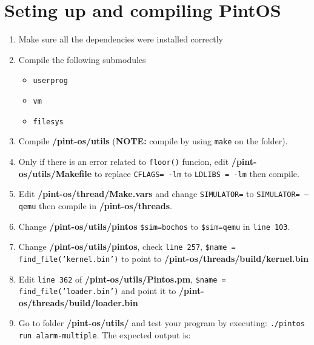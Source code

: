 \documentclass[12pt]{article}
\begin{document}
\section{Seting up and compiling PintOS}
\begin{enumerate}
	\item Make sure all the dependencies were installed correctly
	\item Compile the following submodules
	\begin{itemize}
		\item \texttt{userprog}
		\item \texttt{vm}
		\item \texttt{filesys}
	\end{itemize}
	\item Compile \textbf{/pint-os/utils} (\textbf{NOTE:} compile by using \texttt{make} on the folder).
	\item Only if there is an error related to \texttt{floor()} funcion, edit \textbf{/pint-os/utils/Makefile} to replace \texttt{CFLAGS= -lm} to \texttt{LDLIBS = -lm} then compile.
	\item Edit \textbf{/pint-os/thread/Make.vars} and change \texttt{SIMULATOR=} to \texttt{SIMULATOR= --qemu} then compile in \textbf{/pint-os/threads}.
	\item Change \textbf{/pint-os/utils/pintos} \texttt{\$sim=bochos} to \texttt{\$sim=qemu} in \texttt{line 103}.
	\item Change \textbf{/pint-os/utils/pintos}, check \texttt{line 257}, \texttt{\$name = find\_file('kernel.bin')} to point to \textbf{/pint-os/threads/build/kernel.bin}
	\item Edit \texttt{line 362} of \textbf{/pint-os/utils/Pintos.pm}, \texttt{\$name = find\_file('loader.bin')} and point it to \textbf{/pint-os/threads/build/loader.bin}
	\item Go to folder \textbf{/pint-os/utils/} and test your program by executing: \texttt{./pintos run alarm-multiple}. The expected output is:


\end{enumerate}
\end{document}
